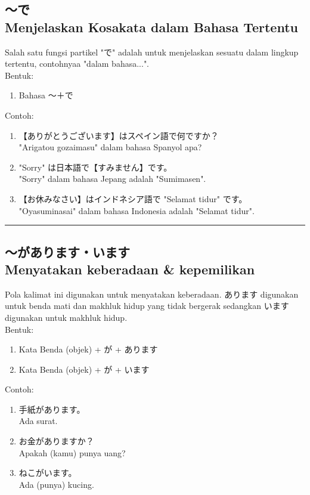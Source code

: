 \subsection*{
    ～で \\
    Menjelaskan Kosakata dalam Bahasa Tertentu
}
Salah satu fungsi partikel "で" adalah untuk menjelaskan sesuatu dalam 
lingkup tertentu, contohnyaa "dalam bahasa...".\\
Bentuk:
\begin{enumerate}
    \item Bahasa ～＋で
\end{enumerate}
Contoh: 
\begin{enumerate}
    \item 【ありがとうございます】はスペイン語で何ですか？
    \\ "Arigatou gozaimasu" dalam bahasa Spanyol apa?
    \item "Sorry" は日本語で【すみません】です。
    \\ "Sorry" dalam bahasa Jepang adalah "Sumimasen".
    \item 【お休みなさい】はインドネシア語で "Selamat tidur" です。
    \\ "Oyasuminasai" dalam bahasa Indonesia adalah "Selamat tidur".
\end{enumerate}

\vspace{0.2cm}\hrule height 1pt\vspace{0.2cm}

\newpage
\subsection*{
    ～があります・います \\
    Menyatakan keberadaan \& kepemilikan
}
Pola kalimat ini digunakan untuk menyatakan keberadaan. あります digunakan 
untuk benda mati dan makhluk hidup yang tidak bergerak sedangkan います 
digunakan untuk makhluk hidup.\\
Bentuk:
\begin{enumerate}
    \item Kata Benda (objek) + が + あります
    \item Kata Benda (objek) + が + います
\end{enumerate}
Contoh: 
\begin{enumerate}
    \item 手紙があります。
    \\ Ada surat.
    \item お金がありますか？
    \\ Apakah (kamu) punya uang?
    \item ねこがいます。
    \\ Ada (punya) kucing.
\end{enumerate}

